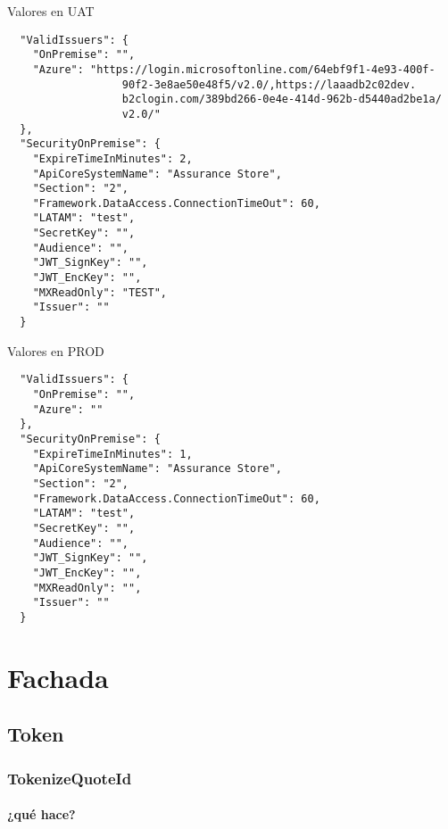 \documentclass[12pt]{book} %
\begin{document}
Valores en UAT
\begin{verbatim}
  "ValidIssuers": {
    "OnPremise": "",
    "Azure": "https://login.microsoftonline.com/64ebf9f1-4e93-400f-
                  90f2-3e8ae50e48f5/v2.0/,https://laaadb2c02dev.
                  b2clogin.com/389bd266-0e4e-414d-962b-d5440ad2be1a/
                  v2.0/"
  },
  "SecurityOnPremise": {
    "ExpireTimeInMinutes": 2,
    "ApiCoreSystemName": "Assurance Store",
    "Section": "2",
    "Framework.DataAccess.ConnectionTimeOut": 60,
    "LATAM": "test",
    "SecretKey": "",
    "Audience": "",
    "JWT_SignKey": "",
    "JWT_EncKey": "",
    "MXReadOnly": "TEST",
    "Issuer": ""
  }
\end{verbatim}


Valores en PROD
\begin{verbatim}
  "ValidIssuers": {
    "OnPremise": "",
    "Azure": ""
  },
  "SecurityOnPremise": {
    "ExpireTimeInMinutes": 1,
    "ApiCoreSystemName": "Assurance Store",
    "Section": "2",
    "Framework.DataAccess.ConnectionTimeOut": 60,
    "LATAM": "test",
    "SecretKey": "",
    "Audience": "",
    "JWT_SignKey": "",
    "JWT_EncKey": "",
    "MXReadOnly": "",
    "Issuer": ""
  }
\end{verbatim}

\chapter{Fachada}

\section{Token}

\subsection{TokenizeQuoteId}
\subsubsection{¿qué hace?}
\end{document}
